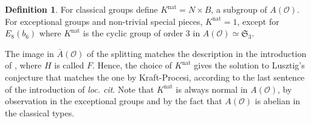\documentclass{amsart}
\theoremstyle{definition}
\newtheorem{definition}[theorem]{Definition}
\DeclareMathOperator{\nat}{nat}
\newcommand{\frakS}{\mathfrak{S}}
\newcommand{\0}{\mathcal{O}}
\begin{document}
\begin{definition}\label{definition:natural_complement_to_H}
For classical groups define $K^{\nat} = N \times B$, a subgroup of $A(\0)$.  For exceptional groups and non-trivial special pieces, $K^{\nat}=1$, except for $E_8(b_6)$ where $K^{\nat}$ is the cyclic group of order $3$ in $A(\0)\simeq \frakS_3$.
\end{definition}

The image in $\bar{A}(\0)$ of the splitting matches the description in the introduction of \cite{Achar-Sage-perverse}, where $H$ is called $F$.  Hence, the choice of $K^{\nat}$ gives the solution to Lusztig's conjecture that matches the one by Kraft-Procesi, according to the last sentence of the introduction of {\it loc. cit}.
Note that $K^{\nat}$ is always normal in $A(\0)$, by observation in the 
exceptional groups and by the fact that $A(\0)$ is abelian in the classical
types.
\end{document}
